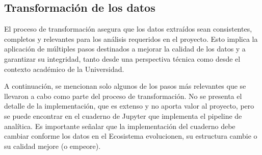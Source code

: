 \subsection{Transformación de los datos}

El proceso de transformación asegura que los datos extraídos sean consistentes, completos y relevantes para los análisis requeridos en el proyecto. Esto implica la aplicación de múltiples pasos destinados a mejorar la calidad de los datos y a garantizar su integridad, tanto desde una perspectiva técnica como desde el contexto académico de la Universidad.

A continuación, se mencionan solo algunos de los pasos más relevantes que se llevaron a cabo como parte del proceso de transformación. No se presenta el detalle de la implementación, que es extenso y no aporta valor al proyecto, pero se puede encontrar en el cuaderno de \gls{Jupyter} que implementa el \gls{pipeline} de analítica. Es importante señalar que la implementación del cuaderno debe cambiar conforme los datos en el Ecosistema evolucionen, su estructura cambie o su calidad mejore (o empeore).

